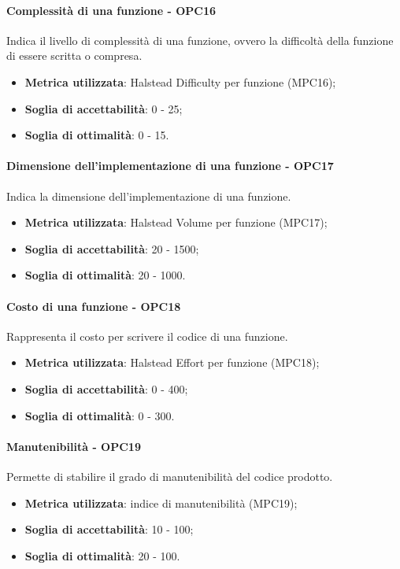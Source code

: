 \documentclass[PianoDiQualifica.tex]{subfiles}
\begin{document}
			\paragraph{Complessità di una funzione - OPC16}
				Indica il livello di complessità di una funzione, ovvero la difficoltà della funzione di essere scritta o compresa.
				\begin{itemize}
					\item \textbf{Metrica utilizzata}: Halstead Difficulty per funzione (MPC16);
					\item \textbf{Soglia di accettabilità}: 0 - 25;
					\item \textbf{Soglia di ottimalità}: 0 - 15.
				\end{itemize}
			
			\paragraph{Dimensione dell'implementazione di una funzione - OPC17}
				Indica la dimensione dell'implementazione di una funzione.
				\begin{itemize}
					\item \textbf{Metrica utilizzata}: Halstead Volume per funzione (MPC17);
					\item \textbf{Soglia di accettabilità}: 20 - 1500;
					\item \textbf{Soglia di ottimalità}: 20 - 1000.
				\end{itemize}
				
			\paragraph{Costo di una funzione - OPC18}
				Rappresenta il costo per scrivere il codice di una funzione.
				\begin{itemize}
					\item \textbf{Metrica utilizzata}: Halstead Effort per funzione (MPC18);
					\item \textbf{Soglia di accettabilità}: 0 - 400;
					\item \textbf{Soglia di ottimalità}: 0 - 300.
				\end{itemize}
				
			\paragraph{Manutenibilità - OPC19}
				Permette di stabilire il grado di manutenibilità del codice prodotto.
				\begin{itemize}
					\item \textbf{Metrica utilizzata}: indice di manutenibilità (MPC19);
					\item \textbf{Soglia di accettabilità}: 10 - 100;
					\item \textbf{Soglia di ottimalità}: 20 - 100.
				\end{itemize}
		
\end{document}
